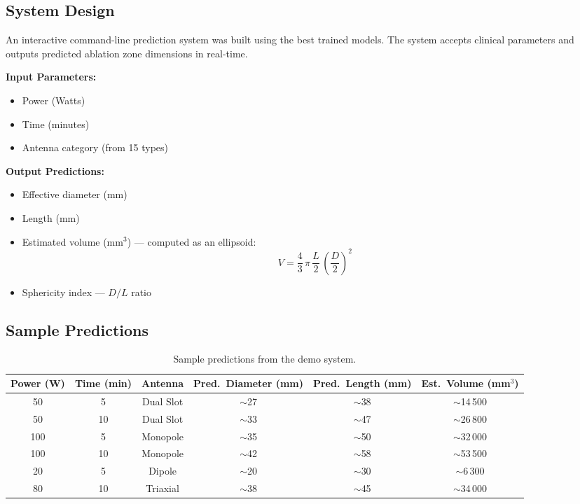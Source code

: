 \documentclass[12pt, a4paper]{article}
\begin{document}
\subsection{System Design}
\label{sec:system-design}

An interactive command-line prediction system was built using the best trained models. The system accepts clinical parameters and outputs predicted ablation zone dimensions in real-time.

\textbf{Input Parameters:}
\begin{itemize}
    \item Power (Watts)
    \item Time (minutes)
    \item Antenna category (from 15 types)
\end{itemize}

\textbf{Output Predictions:}
\begin{itemize}
    \item Effective diameter (mm)
    \item Length (mm)
    \item Estimated volume (mm$^3$) --- computed as an ellipsoid:
    \begin{equation}
        V = \frac{4}{3}\,\pi\,\frac{L}{2}\,\left(\frac{D}{2}\right)^2
    \end{equation}
    \item Sphericity index --- $D/L$ ratio
\end{itemize}

\subsection{Sample Predictions}
\label{sec:sample-predictions}

\begin{table}[H]
\centering
\caption{Sample predictions from the demo system.}
\label{tab:sample-predictions}
\begin{tabular}{@{}cccccc@{}}
\toprule
\textbf{Power (W)} & \textbf{Time (min)} & \textbf{Antenna} & \textbf{Pred.\ Diameter (mm)} & \textbf{Pred.\ Length (mm)} & \textbf{Est.\ Volume (mm$^3$)} \\
\midrule
50  & 5  & Dual Slot & $\sim$27 & $\sim$38 & $\sim$14\,500 \\
50  & 10 & Dual Slot & $\sim$33 & $\sim$47 & $\sim$26\,800 \\
100 & 5  & Monopole  & $\sim$35 & $\sim$50 & $\sim$32\,000 \\
100 & 10 & Monopole  & $\sim$42 & $\sim$58 & $\sim$53\,500 \\
20  & 5  & Dipole    & $\sim$20 & $\sim$30 & $\sim$6\,300  \\
80  & 10 & Triaxial  & $\sim$38 & $\sim$45 & $\sim$34\,000 \\
\bottomrule
\end{tabular}
\end{table}
\end{document}
